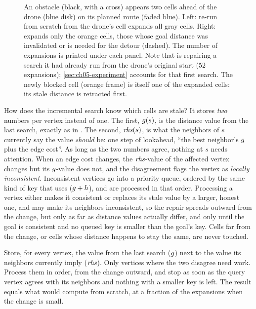\begin{figure}[tb]
  \centering
  \caption{An obstacle (black, with a cross) appears two cells ahead of the drone (blue
  disk) on its planned route (faded blue). Left: \astar re-run from scratch from the
  drone's cell expands all gray cells. Right: \dstarlite expands only the orange cells,
  those whose goal distance was invalidated or is needed for the detour (dashed). The
  number of expansions is printed under each panel. Note that \dstarlite is repairing a
  search it had already run from the drone's original start ($52$ expansions);
  \cref{sec:ch05-experiment} accounts for that first search. The newly blocked cell
  (orange frame) is itself one of the expanded cells: its stale distance is retracted
  first.}
  \label{fig:ch05-idea}
\end{figure}

How does the incremental search know which cells are stale? It stores \emph{two}
numbers per vertex instead of one. The first, $g(s)$, is the distance value from
the last search, exactly as in \astar. The second, $\mathit{rhs}(s)$, is what the neighbors of
$s$ currently say the value \emph{should} be: one step of lookahead, ``the best
neighbor's $g$ plus the edge cost''. As long as the two numbers agree, nothing at
$s$ needs attention. When an edge cost changes, the $\mathit{rhs}$-value of the affected vertex
changes but its $g$-value does not, and the disagreement flags the vertex as
\emph{locally inconsistent}. Inconsistent vertices go into a priority queue, ordered by
the same kind of key that \astar uses ($g + h$), and are processed in that
order. Processing a vertex either makes it consistent or replaces its stale value by a
larger, honest one, and may make its neighbors inconsistent,
so the repair spreads outward from the change, but only as far as distance values
actually differ, and only until the goal is consistent and no queued key is smaller than
the goal's key. Cells far from the change, or cells whose distance happens to stay the
same, are never touched.

\begin{keyidea}
Store, for every vertex, the value from the last search ($g$) next to the value its
neighbors currently imply ($\mathit{rhs}$). Only vertices where the two disagree need work.
Process them in \astar order, from the change outward, and stop as soon as the query
vertex agrees with its neighbors and nothing with a smaller key is left. The result
equals what \astar would compute from scratch, at a fraction of the expansions when the
change is small.
\end{keyidea}

